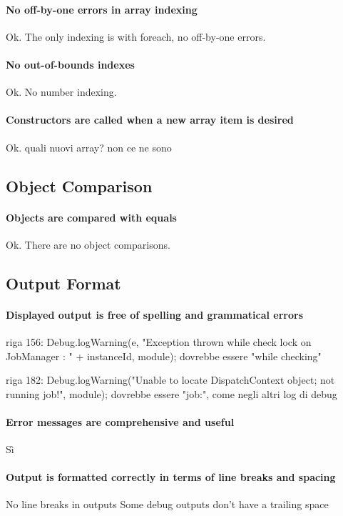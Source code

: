 \documentclass[english]{article}
\begin{document}
\paragraph{No off-by-one errors in array indexing}
Ok.
The only indexing is with foreach, no off-by-one errors.

\paragraph{No out-of-bounds indexes}
Ok.
No number indexing.

\paragraph{Constructors are called when a new array item is desired}
Ok.
quali nuovi array? non ce ne sono

\subsection{Object Comparison}
\paragraph{Objects are compared with equals}
Ok.
There are no object comparisons.

\subsection{Output Format}
\paragraph{Displayed output is free of spelling and grammatical errors}
riga 156:
Debug.logWarning(e, "Exception thrown while check lock on JobManager : " + instanceId, module);
dovrebbe essere "while checking"

riga 182:
Debug.logWarning("Unable to locate DispatchContext object; not running job!", module);
dovrebbe essere "job:", come negli altri log di debug

\paragraph{Error messages are comprehensive and useful}
Sì

\paragraph{Output is formatted correctly in terms of line breaks and spacing}
No line breaks in outputs
Some debug outputs don't have a trailing space ~
\end{document}
